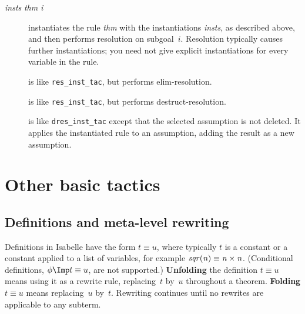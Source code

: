 \begin{description}
\item[ {\it insts} {\it thm} {\it i}]
instantiates the rule {\it thm} with the instantiations {\it insts}, as
described above, and then performs resolution on subgoal~$i$.  Resolution
typically causes further instantiations; you need not give explicit
instantiations for every variable in the rule.

\item[] 
is like {\tt res_inst_tac}, but performs elim-resolution.

\item[] 
is like {\tt res_inst_tac}, but performs destruct-resolution.

\item[] 
is like {\tt dres_inst_tac} except that the selected assumption is not
deleted.  It applies the instantiated rule to an assumption, adding the
result as a new assumption.
\end{description}


\section{Other basic tactics}
\subsection{Definitions and meta-level rewriting}
Definitions in Isabelle have the form $t\equiv u$, where typically $t$ is a
constant or a constant applied to a list of variables, for example $\it
sqr(n)\equiv n\times n$.  (Conditional definitions, $\phi\Imp t\equiv u$,
are not supported.)  {\bf Unfolding} the definition $t\equiv u$ means using
it as a rewrite rule, replacing~$t$ by~$u$ throughout a theorem.  {\bf
Folding} $t\equiv u$ means replacing~$u$ by~$t$.  Rewriting continues until
no rewrites are applicable to any subterm.

